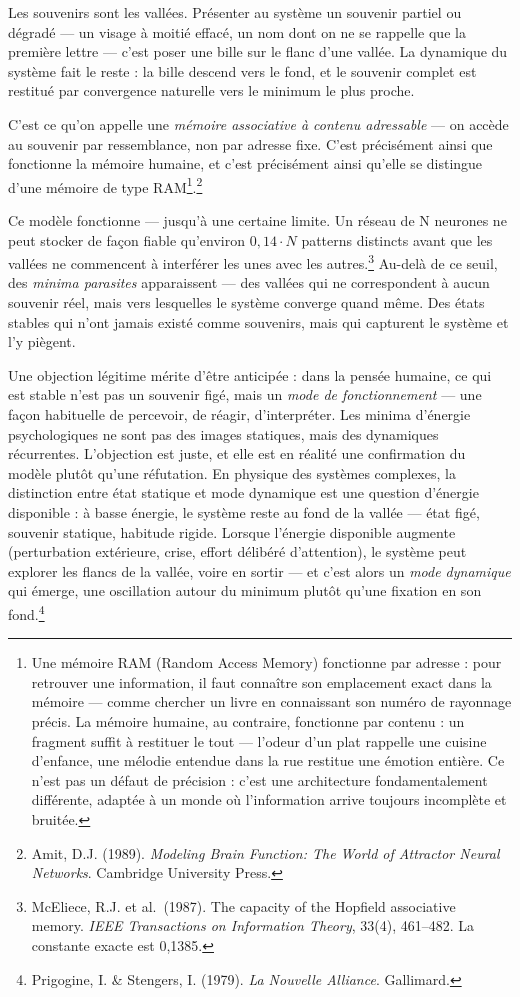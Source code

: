 \documentclass[french, 11pt, twoside, openright, a5paper]{book}
\newcommand{\soussection}[1]{%
  \addcontentsline{toc}{section}{#1}%
  \vspace{1.5em plus 0.4em minus 0.2em}%
  \noindent{\large\bfseries #1}\par\nobreak\vspace{0.6em}%
}
\begin{document}
Les souvenirs sont les vallées. Présenter au système un souvenir partiel
ou dégradé --- un visage à moitié effacé, un nom dont on ne se rappelle
que la première lettre --- c'est poser une bille sur le flanc d'une
vallée. La dynamique du système fait le reste : la bille descend vers le
fond, et le souvenir complet est restitué par convergence naturelle vers
le minimum le plus proche.

C'est ce qu'on appelle une \emph{mémoire associative à contenu
adressable} --- on accède au souvenir par ressemblance, non par adresse
fixe. C'est précisément ainsi que fonctionne la mémoire humaine, et
c'est précisément ainsi qu'elle se distingue d'une mémoire de type RAM\footnote{Une mémoire RAM (Random Access Memory) fonctionne par adresse : pour retrouver une information, il faut connaître son emplacement exact dans la mémoire --- comme chercher un livre en connaissant son numéro de rayonnage précis. La mémoire humaine, au contraire, fonctionne par contenu : un fragment suffit à restituer le tout --- l'odeur d'un plat rappelle une cuisine d'enfance, une mélodie entendue dans la rue restitue une émotion entière. Ce n'est pas un défaut de précision : c'est une architecture fondamentalement différente, adaptée à un monde où l'information arrive toujours incomplète et bruitée.}.\footnote{Amit, D.J. (1989). \emph{Modeling Brain Function: The World of Attractor Neural Networks}. Cambridge University Press.}

\soussection{Les limites du paysage réel}

Ce modèle fonctionne --- jusqu'à une certaine limite. Un réseau de N
neurones ne peut stocker de façon fiable qu'environ $0{,}14 \cdot N$ patterns
distincts avant que les vallées ne commencent à interférer les unes avec
les autres.\footnote{McEliece, R.J. et al.~(1987). The capacity of the Hopfield associative memory. \emph{IEEE Transactions on Information Theory}, 33(4), 461--482. La constante exacte est 0,1385.} Au-delà de ce seuil, des \emph{minima parasites}
apparaissent --- des vallées qui ne correspondent à aucun souvenir réel,
mais vers lesquelles le système converge quand même. Des états stables
qui n'ont jamais existé comme souvenirs, mais qui capturent le système
et l'y piègent.

Une objection légitime mérite d'être anticipée : dans la pensée humaine,
ce qui est stable n'est pas un souvenir figé, mais un \emph{mode de
fonctionnement} --- une façon habituelle de percevoir, de réagir,
d'interpréter. Les minima d'énergie psychologiques ne sont pas des
images statiques, mais des dynamiques récurrentes. L'objection est
juste, et elle est en réalité une confirmation du modèle plutôt qu'une
réfutation. En physique des systèmes complexes, la distinction entre
état statique et mode dynamique est une question d'énergie disponible :
à basse énergie, le système reste au fond de la vallée --- état figé,
souvenir statique, habitude rigide. Lorsque l'énergie disponible
augmente (perturbation extérieure, crise, effort délibéré d'attention),
le système peut explorer les flancs de la vallée, voire en sortir --- et
c'est alors un \emph{mode dynamique} qui émerge, une oscillation autour
du minimum plutôt qu'une fixation en son fond.\footnote{Prigogine, I. \& Stengers, I. (1979). \emph{La Nouvelle Alliance}. Gallimard.}
\end{document}
